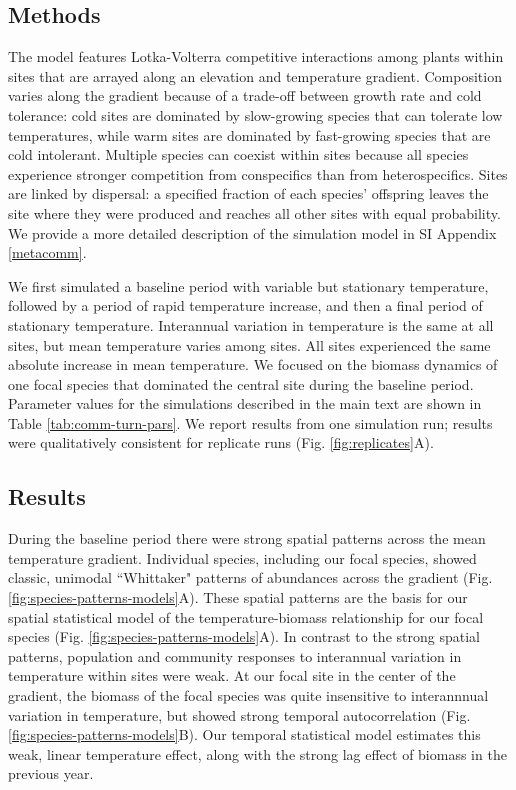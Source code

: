 \documentclass[11pt]{article}
\begin{document}
\subsection*{Methods}

The model features Lotka-Volterra competitive interactions among plants within sites that are arrayed along an elevation and temperature gradient. Composition varies along the gradient because of a trade-off between growth rate and cold tolerance: cold sites are dominated by slow-growing species that can tolerate low temperatures, while warm sites are dominated by  fast-growing species that are cold intolerant. Multiple species can coexist within sites because all species experience stronger competition from conspecifics than from heterospecifics. Sites are linked by dispersal: a specified fraction of each species' offspring leaves the site where they were produced and reaches all other sites with equal probability. We provide a more detailed description of the simulation model in SI Appendix \ref{metacomm}. 

We first simulated a baseline period with variable but stationary temperature, followed by a period of rapid temperature increase, and then a final period of stationary temperature. Interannual variation in temperature is the same at all sites, but mean temperature varies among sites. All sites experienced the same absolute increase in mean temperature. We focused on the biomass dynamics of one focal species that dominated the central site during the baseline period. Parameter values for the simulations described in the main text are shown in Table \ref{tab:comm-turn-pars}. We report results from one simulation run; results were qualitatively consistent for replicate runs (Fig. \ref{fig:replicates}A).

\subsection*{Results}

During the baseline period there were strong spatial patterns across the mean temperature gradient. 
Individual species, including our focal species, showed classic, unimodal ``Whittaker" patterns of abundances across the gradient (Fig. \ref{fig:species-patterns-models}A).
These spatial patterns are the basis for our spatial statistical model of the temperature-biomass relationship for our focal species (Fig. \ref{fig:species-patterns-models}A). 
In contrast to the strong spatial patterns, population and community responses to interannual variation in temperature within sites were weak.
At our focal site in the center of the gradient, the biomass of the focal species was quite insensitive to interannnual variation in temperature, but showed strong temporal autocorrelation (Fig. \ref{fig:species-patterns-models}B). Our temporal statistical model estimates this weak, linear temperature effect, along with the strong lag effect of biomass in the previous year. 
\end{document}
